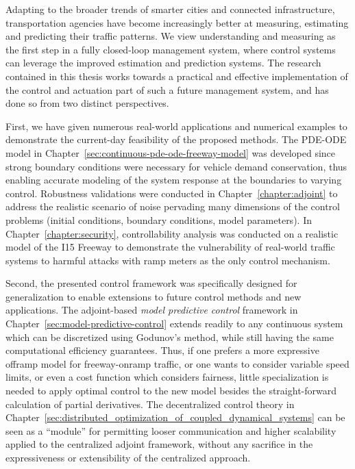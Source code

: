 Adapting to the broader trends of smarter cities and connected infrastructure, transportation agencies have become increasingly better at measuring, estimating and predicting their traffic patterns. We view understanding and measuring as the first step in a fully closed-loop management system, where control systems can leverage the improved estimation and prediction systems. The research contained in this thesis works towards a practical and effective implementation of the control and actuation part of such a future management system, and has done so from two distinct perspectives.

First, we have given numerous real-world applications and numerical examples to demonstrate the current-day feasibility of the proposed methods. The PDE-ODE model in Chapter~\ref{sec:continuous-pde-ode-freeway-model} was developed since strong boundary conditions were necessary for vehicle demand conservation, thus enabling accurate modeling of the system response at the boundaries to varying control. Robustness validations were conducted in Chapter~\ref{chapter:adjoint} to address the realistic scenario of noise pervading many dimensions of the control problems (initial conditions, boundary conditions, model parameters). In Chapter~\ref{chapter:security}, controllability analysis was conducted on a realistic model of the I15 Freeway to demonstrate the vulnerability of real-world traffic systems to harmful attacks with ramp meters as the only control mechanism.

Second, the presented control framework was specifically designed for generalization to enable extensions to future control methods and new applications. The adjoint-based \emph{model predictive control} framework in Chapter~\ref{sec:model-predictive-control} extends readily to any continuous system which can be discretized using Godunov's method, while still having the same computational efficiency guarantees. Thus, if one prefers a more expressive offramp model for freeway-onramp traffic, or one wants to consider variable speed limits, or even a cost function which considers fairness, little specialization is needed to apply optimal control to the new model besides the straight-forward calculation of partial derivatives. The decentralized control theory in Chapter~\ref{sec:distributed_optimization_of_coupled_dynamical_systems} can be seen as a ``module'' for permitting looser communication and higher scalability applied to the centralized adjoint framework, without any sacrifice in the expressiveness or extensibility of the centralized approach.

